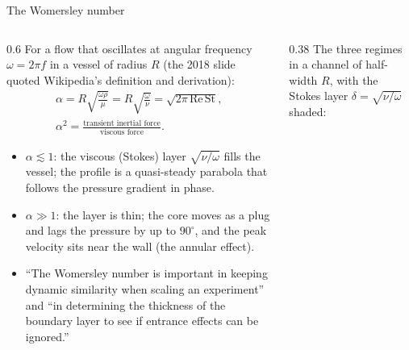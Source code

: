 \documentclass[aspectratio=169,11pt]{beamer}
\begin{document}
\begin{frame}{The Womersley number}
\label{fr:womersley}
\begin{columns}[T,onlytextwidth]
\begin{column}{0.6\textwidth}
\small\setlength{\abovedisplayskip}{2pt}\setlength{\belowdisplayskip}{1pt} For a flow that oscillates at angular frequency $\omega = 2\pi f$ in a vessel of radius $R$ (the 2018 slide quoted Wikipedia's definition and derivation):
\begin{gather*}
  \alpha = R\sqrt{\frac{\omega\rho}{\mu}} = R\sqrt{\frac{\omega}{\nu}} = \sqrt{2\pi\,\mathrm{Re}\,\mathrm{St}},\\
  \alpha^2 = \frac{\text{transient inertial force}}{\text{viscous force}}.
\end{gather*}
\begin{itemize}\footnotesize\setlength{\itemsep}{0pt}
  \item $\alpha \lesssim 1$: the viscous (Stokes) layer $\sqrt{\nu/\omega}$ fills the vessel; the profile is a quasi-steady parabola that follows the pressure gradient in phase.
  \item $\alpha \gg 1$: the layer is thin; the core moves as a plug and lags the pressure by up to $90^\circ$, and the peak velocity sits near the wall (the annular effect).
  \item ``The Womersley number is important in keeping dynamic similarity when scaling an experiment'' and ``in determining the thickness of the boundary layer to see if entrance effects can be ignored.''
\end{itemize}
\end{column}
\begin{column}{0.38\textwidth}
\footnotesize The three regimes in a channel of half-width $R$, with the Stokes layer $\delta = \sqrt{\nu/\omega}$ shaded:
\vspace{1mm}

\centering
{}
\end{column}
\end{columns}
\end{frame}
\end{document}

